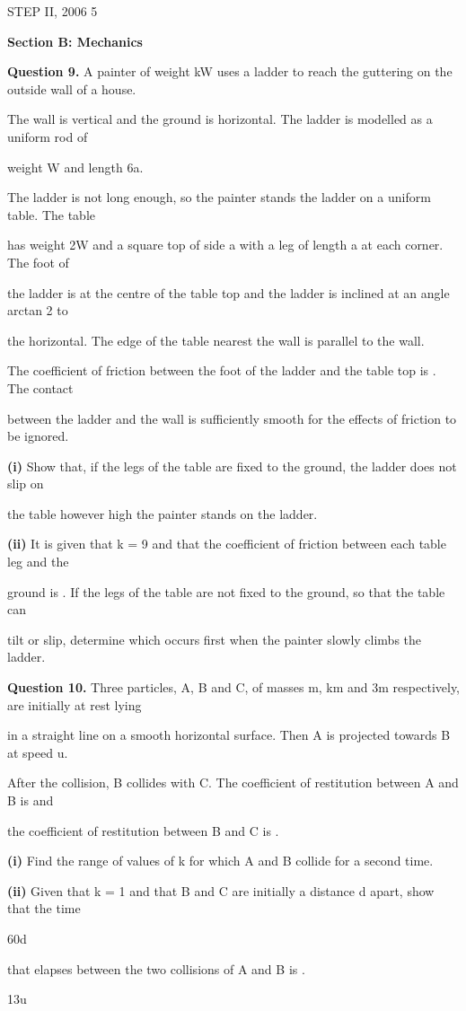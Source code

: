 \documentclass[12pt]{article}
\begin{document}
\begin{flushleft}
STEP II, 2006 5\par
\bigskip\textbf{Section B: Mechanics}\par
\bigskip\textbf{Question 9.} A painter of weight kW uses a ladder to reach the guttering on the outside wall of a house.\par
The wall is vertical and the ground is horizontal. The ladder is modelled as a uniform rod of\par
weight W and length 6a.\par
The ladder is not long enough, so the painter stands the ladder on a uniform table. The table\par
has weight 2W and a square top of side a with a leg of length a at each corner. The foot of\par
the ladder is at the centre of the table top and the ladder is inclined at an angle arctan 2 to\par
the horizontal. The edge of the table nearest the wall is parallel to the wall.\par
The coefficient of friction between the foot of the ladder and the table top is . The contact\par
between the ladder and the wall is sufficiently smooth for the effects of friction to be ignored.\par
\textbf{(i)} Show that, if the legs of the table are fixed to the ground, the ladder does not slip on\par
the table however high the painter stands on the ladder.\par
\textbf{(ii)} It is given that k = 9 and that the coefficient of friction between each table leg and the\par
ground is . If the legs of the table are not fixed to the ground, so that the table can\par
tilt or slip, determine which occurs first when the painter slowly climbs the ladder.\par
[Note: arctan 2 is another notation for tan\par
-1\par
2.]\par
\bigskip\textbf{Question 10.} Three particles, A, B and C, of masses m, km and 3m respectively, are initially at rest lying\par
in a straight line on a smooth horizontal surface. Then A is projected towards B at speed u.\par
After the collision, B collides with C. The coefficient of restitution between A and B is and\par
the coefficient of restitution between B and C is .\par
\textbf{(i)} Find the range of values of k for which A and B collide for a second time.\par
\textbf{(ii)} Given that k = 1 and that B and C are initially a distance d apart, show that the time\par
60d\par
that elapses between the two collisions of A and B is .\par
13u\par
\end{flushleft}
\end{document}
